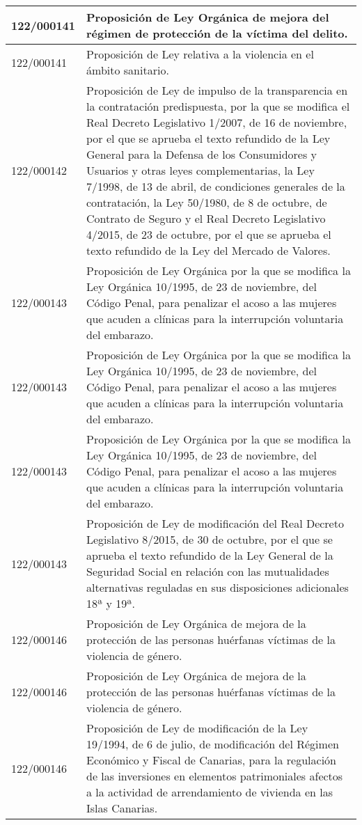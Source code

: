 {\begin{table}[H]
\begin{center}
\begin{tabularx}{\linewidth}{| l | X |}
\hline
122/000141 & Proposición de Ley Orgánica de mejora del régimen de protección de la víctima del delito. \\
\hline
122/000141 & Proposición de Ley relativa a la violencia en el ámbito sanitario. \\
\hline
122/000142 & Proposición de Ley de impulso de la transparencia en la contratación predispuesta, por la que se modifica el Real Decreto Legislativo 1/2007, de 16 de noviembre, por el que se aprueba el texto refundido de la Ley General para la Defensa de los Consumidores y Usuarios y otras leyes complementarias, la Ley 7/1998, de 13 de abril, de condiciones generales de la contratación, la Ley 50/1980, de 8 de octubre, de Contrato de Seguro y el Real Decreto Legislativo 4/2015, de 23 de octubre, por el que se aprueba el texto refundido de la Ley del Mercado de Valores. \\
\hline
122/000143 & Proposición de Ley Orgánica por la que se modifica la Ley Orgánica 10/1995, de 23 de noviembre, del Código Penal, para penalizar el acoso a las mujeres que acuden a clínicas para la interrupción voluntaria del embarazo. \\
\hline
122/000143 & Proposición de Ley Orgánica por la que se modifica la Ley Orgánica 10/1995, de 23 de noviembre, del Código Penal, para penalizar el acoso a las mujeres que acuden a clínicas para la interrupción voluntaria del embarazo. \\
\hline
122/000143 & Proposición de Ley Orgánica por la que se modifica la Ley Orgánica 10/1995, de 23 de noviembre, del Código Penal, para penalizar el acoso a las mujeres que acuden a clínicas para la interrupción voluntaria del embarazo. \\
\hline
122/000143 & Proposición de Ley de modificación del Real Decreto Legislativo 8/2015, de 30 de octubre, por el que se aprueba el texto refundido de la Ley General de la Seguridad Social en relación con las mutualidades alternativas reguladas en sus disposiciones adicionales 18ª y 19ª. \\
\hline
122/000146 & Proposición de Ley Orgánica de mejora de la protección de las personas huérfanas víctimas de la violencia de género. \\
\hline
122/000146 & Proposición de Ley Orgánica de mejora de la protección de las personas huérfanas víctimas de la violencia de género. \\
\hline
122/000146 & Proposición de Ley de modificación de la Ley 19/1994, de 6 de julio, de modificación del Régimen Económico y Fiscal de Canarias, para la regulación de las inversiones en elementos patrimoniales afectos a la actividad de arrendamiento de vivienda en las Islas Canarias. \\

\end{tabularx}
\end{center}
\end{table}}
